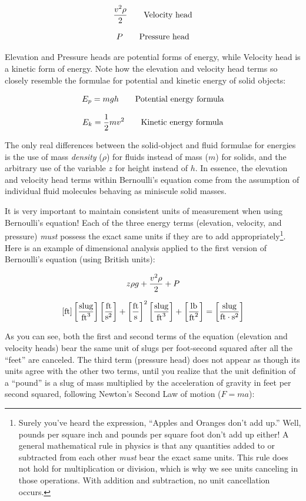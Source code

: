 $${v^2 \rho \over 2} \hbox{\hskip 20pt Velocity head}$$

$$P \hbox{\hskip 20pt Pressure head}$$

Elevation and Pressure heads are potential forms of energy, while Velocity head is a kinetic form of energy.  Note how the elevation and velocity head terms so closely resemble the formulae for potential and kinetic energy of solid objects:

$$E_p = mgh \hbox{\hskip 20pt Potential energy formula}$$

$$E_k = {1 \over 2}mv^2 \hbox{\hskip 20pt Kinetic energy formula}$$

The only real differences between the solid-object and fluid formulae for energies is the use of mass \textit{density} ($\rho$) for fluids instead of mass ($m$) for solids, and the arbitrary use of the variable $z$ for height instead of $h$.  In essence, the elevation and velocity head terms within Bernoulli's equation come from the assumption of individual fluid molecules behaving as miniscule solid masses.

\vskip 10pt

It is very important to maintain consistent units of measurement when using Bernoulli's equation!  Each of the three energy terms (elevation, velocity, and pressure) \textit{must} possess the exact same units if they are to add appropriately\footnote{Surely you've heard the expression, ``Apples and Oranges don't add up.''  Well, pounds per square inch and pounds per square foot don't add up either!  A general mathematical rule in physics is that any quantities added to or subtracted from each other \textit{must} bear the exact same units.  This rule does not hold for multiplication or division, which is why we see units canceling in those operations.  With addition and subtraction, no unit cancellation occurs.}.  Here is an example of dimensional analysis applied to the first version of Bernoulli's equation (using British units):  

$$z \rho g + {v^2 \rho \over 2} + P$$

$$[\hbox{ft}] \left[\hbox{slug} \over \hbox{ft}^3\right] \left[\hbox{ft} \over \hbox{s}^2 \right] +  \left[\hbox{ft} \over \hbox{s} \right]^2 \left[\hbox{slug} \over \hbox{ft}^3\right] + \left[\hbox{lb} \over  \hbox{ft}^2\right] = \left[\hbox{slug} \over \hbox{ft} \cdot \hbox{s}^2 \right]$$

As you can see, both the first and second terms of the equation (elevation and velocity heads) bear the same unit of slugs per foot-second squared after all the ``feet'' are canceled.  The third term (pressure head) does not appear as though its units agree with the other two terms, until you realize that the unit definition of a ``pound'' is a slug of mass multiplied by the acceleration of gravity in feet per second squared, following Newton's Second Law of motion ($F = ma$):

